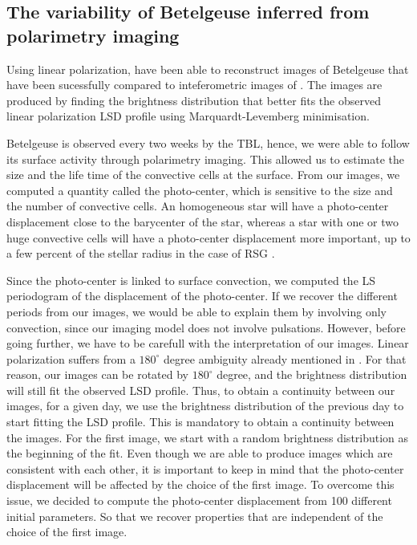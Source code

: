 \documentclass{aa}
\begin{document}
\subsection{The variability of Betelgeuse inferred from polarimetry imaging}

Using linear polarization, \cite{lopez_ariste_convective_2018} have been able to reconstruct images of Betelgeuse that have been sucessfully compared 
to inteferometric images of \cite{montarges_close_2016}. The images are produced by finding the brightness distribution that better fits the observed linear 
polarization LSD profile using Marquardt-Levemberg minimisation.

Betelgeuse is observed every two weeks by the TBL, hence,
we were able to follow its surface activity through polarimetry imaging. This allowed us to estimate the size and the life time of the convective cells
at the surface. From our images, we computed a quantity called the photo-center, which is sensitive to the size and the number of convective cells. 
An homogeneous star will have a photo-center displacement close to the barycenter of the star, whereas a star with one or two huge convective cells will have a
photo-center displacement more important, up to a few percent of the stellar radius in the case of RSG \citep{chiavassa_probing_2022}. 

Since the photo-center is linked to surface convection, 
we computed the LS periodogram of the displacement of the photo-center. If we recover the different periods from our images, we would
be able to explain them by involving only convection, since our imaging model does not involve pulsations. However, before going further, we have to be carefull with the interpretation of our images. 
Linear polarization suffers from a $180 ^\circ$ degree ambiguity already mentioned in \cite{auriere_discovery_2016}. For that reason, our images can be 
rotated by $180^\circ$ degree, and the brightness distribution will still fit the observed LSD profile. Thus, to obtain a continuity between our images, 
for a given day, we use the brightness distribution of the previous day to start fitting the LSD profile. This is mandatory to obtain a continuity between the images. For the first image, we start with a 
random brightness distribution as the beginning of the fit. Even though we are able to produce images which are consistent with each other, it is important 
to keep in mind that the photo-center displacement will be affected by the choice of the first image. To overcome this issue, we decided to compute
the photo-center displacement from 100 different initial parameters. So that we recover properties that are independent of the choice of the first image. 
\end{document}
